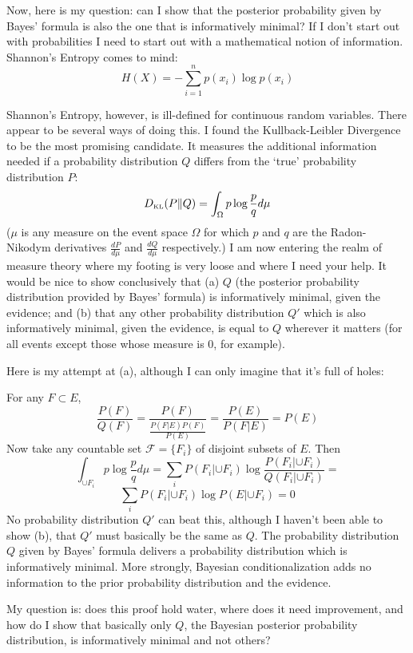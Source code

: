 \documentclass[11pt]{article}
\begin{document}
Now, here is my question: can I show that the posterior probability
given by Bayes' formula is also the one that is informatively minimal?
If I don't start out with probabilities I need to start out with a
mathematical notion of information. Shannon's Entropy comes to mind:
\begin{equation}
    H(X)=-\sum_{i=1}^{n}p(x_{i})\log p(x_{i})
\label{eq:shannon}
  \end{equation}

Shannon's Entropy, however, is ill-defined for continuous random
variables. There appear to be several ways of doing this. I found the
Kullback-Leibler Divergence to be the most promising candidate. It
measures the additional information needed if a probability
distribution $Q$ differs from the `true' probability distribution $P$:
\begin{equation}
  \label{eq:kulei}
  D_{\mbox{\tiny{KL}}}(P\|Q)=\int_{\Omega}p\log\frac{p}{q}d\mu
\end{equation}
($\mu$ is any measure on the event space $\Omega$ for which
$p$ and $q$ are the Radon-Nikodym derivatives $\frac{dP}{d\mu}$ and
$\frac{dQ}{d\mu}$ respectively.) I am now entering the realm of
measure theory where my footing is very loose and where I need your
help. It would be nice to show conclusively that (a) $Q$ (the
posterior probability distribution provided by Bayes' formula) is
informatively minimal, given the evidence; and (b) that any other
probability distribution $Q'$ which is also informatively minimal,
given the evidence, is equal to $Q$ wherever it matters (for all
events except those whose measure is $0$, for example).

Here is my attempt at (a), although I can only imagine that it's full
of holes:

For any $F\subset E$,
\begin{displaymath}
  \frac{P(F)}{Q(F)}=\frac{P(F)}{\frac{P(F|E)P(F)}{P(E)}}=\frac{P(E)}{P(F|E)}=P(E)
\end{displaymath}
Now take any countable set $\mathcal{F}=\{F_{i}\}$ of disjoint subsets
of $E$. Then
\begin{displaymath}
  \int_{\cup F_{i}}p\log\frac{p}{q}d\mu=\sum_{i}P(F_{i}|\cup F_{i})\log\frac{P(F_{i}|\cup F_{i})}{Q(F_{i}|\cup F_{i})}=
\end{displaymath}
\begin{displaymath}
  \sum_{i}P(F_{i}|\cup F_{i})\log P(E|\cup F_{i})=0
\end{displaymath}
No probability distribution $Q'$ can beat this, although I haven't
been able to show (b), that $Q'$ must basically be the same as $Q$.
The probability distribution $Q$ given by Bayes' formula delivers a
probability distribution which is informatively minimal. More
strongly, Bayesian conditionalization adds no information to the prior
probability distribution and the evidence.

My question is: does this proof hold water, where does it need
improvement, and how do I show that basically only $Q$, the Bayesian
posterior probability distribution, is informatively minimal and not
others?

\nocite{*}


\end{document}
